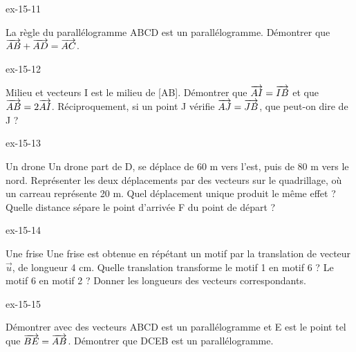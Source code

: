 \clearpage{}
\begin{blocLivre}{ex-15-11}\begin{exercice}[3]{La règle du parallélogramme}
ABCD est un parallélogramme. Démontrer que $\overrightarrow{AB}+\overrightarrow{AD}=\overrightarrow{AC}$.
\label{fig-ex-15-11}
\end{exercice}\end{blocLivre}
\begin{blocLivre}{ex-15-12}\begin{exercice}[3]{Milieu et vecteurs}
I est le milieu de [AB]. Démontrer que $\overrightarrow{AI}=\overrightarrow{IB}$ et que $\overrightarrow{AB}=2\overrightarrow{AI}$. Réciproquement, si un point J vérifie $\overrightarrow{AJ}=\overrightarrow{JB}$, que peut-on dire de J ?
\label{fig-ex-15-12}
\end{exercice}\end{blocLivre}
\begin{blocLivre}{ex-15-13}\begin{exercice}[3]{Un drone}
Un drone part de D, se déplace de 60 m vers l’est, puis de 80 m vers le nord. Représenter les deux déplacements par des vecteurs sur le quadrillage, où un carreau représente 20 m. Quel déplacement unique produit le même effet ? Quelle distance sépare le point d’arrivée F du point de départ ?
\label{fig-ex-15-13}
\end{exercice}\end{blocLivre}
\begin{blocLivre}{ex-15-14}\begin{exercice}[3]{Une frise}
Une frise est obtenue en répétant un motif par la translation de vecteur $\vec u$, de longueur 4 cm. Quelle translation transforme le motif 1 en motif 6 ? Le motif 6 en motif 2 ? Donner les longueurs des vecteurs correspondants.
\label{fig-ex-15-14}
\end{exercice}\end{blocLivre}
\begin{blocLivre}{ex-15-15}\begin{exercice}[3]{Démontrer avec des vecteurs}
ABCD est un parallélogramme et E est le point tel que $\overrightarrow{BE}=\overrightarrow{AB}$. Démontrer que DCEB est un parallélogramme.
\label{fig-ex-15-15}
\end{exercice}\end{blocLivre}

\clearpage
